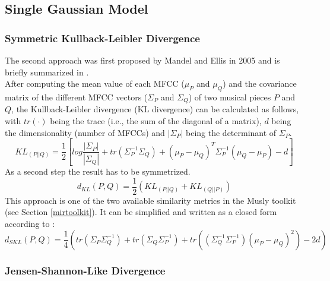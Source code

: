 \subsection{Single Gaussian Model}

\subsubsection{Symmetric Kullback-Leibler Divergence}\label{klth}

The second approach was first proposed by Mandel and Ellis in 2005 \cite{mandelellis1} and is briefly summarized in \cite[pp. 65f]{knees1}.\\
After computing the mean value of each MFCC ($\mu_P$ and $\mu_Q$) and the covariance matrix of the different MFCC vectors ($\Sigma_P$ and $\Sigma_Q$) of two musical pieces $P$ and $Q$, the Kullback-Leibler divergence (KL divergence) can be calculated as follows, with $tr(\cdot)$ being the trace (i.e., the sum of the diagonal of a matrix), $d$ being the dimensionality (number of MFCCs) and $|\Sigma_P|$ being the determinant of $\Sigma_P$.\\
\begin{equation} \label{eq:KL1}
KL_{(P||Q)} = \frac{1}{2}[log\frac{|\Sigma_P|}{|\Sigma_Q|} + tr(\Sigma_P^{-1}\Sigma_Q) + (\mu_P - \mu_Q)^T \Sigma_P^{-1} (\mu_Q - \mu_P) - d]
\end{equation}
As a second step the result has to be symmetrized.
\begin{equation} \label{eq:KL2}
d_{KL}(P, Q) = \frac{1}{2} (KL_{(P||Q)} + KL_{(Q||P)}) 
\end{equation}
This approach is one of the two available similarity metrics in the Musly \cite{musly1} toolkit (see Section \ref{mirtoolkit}). It can be simplified and written as a closed form according to \cite[p. 44]{schnitzer1}:
\begin{equation} \label{eq:SKL}
d_{SKL}(P, Q) = \frac{1}{4} (tr(\Sigma_P\Sigma_Q^{-1}) + tr(\Sigma_Q\Sigma_P^{-1}) + tr((\Sigma_Q^{-1}\Sigma_P^{-1})(\mu_P - \mu_Q)^2) - 2d)
\end{equation}

\subsubsection{Jensen-Shannon-Like Divergence}

